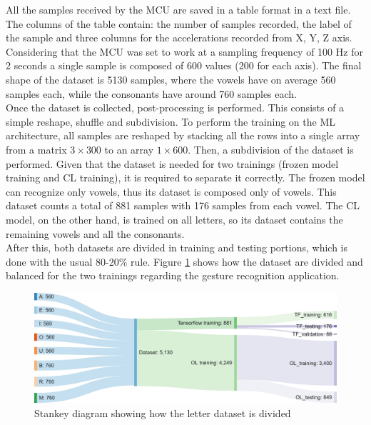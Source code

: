 \documentclass[12pt]{report}
\begin{document}
All the samples received by the MCU are saved in a table format in a text file. The columns of the table contain: the number of samples recorded, the label of the sample and three columns for the accelerations recorded from X, Y, Z axis. Considering that the MCU was set to work at a sampling frequency of 100 Hz for 2 seconds a single sample is composed of 600 values (200 for each axis). 
The final shape of the dataset is 5130 samples, where the vowels have on average 560 samples each, while the consonants have around 760 samples each. \\
Once the dataset is collected, post-processing is performed. This consists of a simple reshape, shuffle and subdivision. To perform the training on the ML architecture, all samples are reshaped by stacking all the rows into a single array from a matrix $3 \times 300$ to an array $1 \times 600$. Then, a subdivision of the dataset is performed. Given that the dataset is needed for two trainings (frozen model training and CL training), it is required to separate it correctly. The frozen model can recognize only vowels, thus its dataset is composed only of vowels. This dataset counts a total of 881 samples with 176 samples from each vowel. The CL model, on the other hand, is trained on all letters, so its dataset contains the remaining vowels and all the consonants. \\
After this, both datasets are divided in training and testing portions, which is done with the usual 80-20\% rule. Figure \ref{fig:flow_dataset_letters} shows how the dataset are divided and balanced for the two trainings regarding the gesture recognition application.

\begin{figure}[h!]
    \centering
    \includegraphics[width=120mm]{Figures/Chapter4/flow_dataset_letters.png} 
    \caption{Stankey diagram showing how the letter dataset is divided}
    \label{fig:flow_dataset_letters}    
\end{figure}
\end{document}
